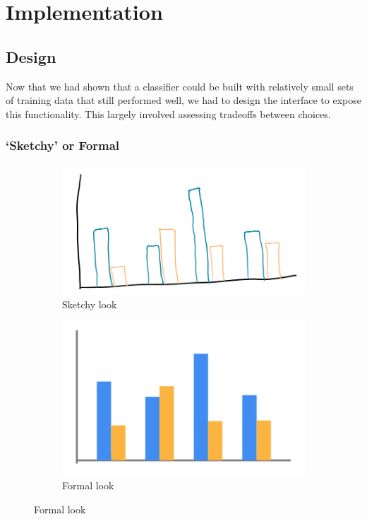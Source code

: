 \chapter{Implementation}
\section{Design}
	Now that we had shown that a classifier could be built with relatively small sets of training data that still performed well, we had to design the interface to expose this functionality. This largely involved assessing tradeoffs between choices.
	
	\subsection{`Sketchy' or Formal}	
	\begin{figure}[h]
		\centering
		\begin{subfigure}[b]{0.4\textwidth}
			\includegraphics[width=\textwidth]{sketchy}
			\caption{Sketchy look}
			\label{fig:sketchy}
		\end{subfigure}
		\begin{subfigure}[b]{0.4\textwidth}
			\includegraphics[width=\textwidth]{formal}
			\caption{Formal look}
			\label{fig:formal}
		\end{subfigure}
	\end{figure}
